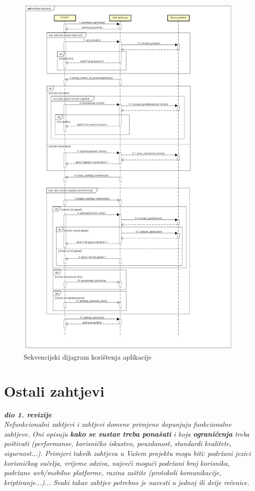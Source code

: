 				\begin{figure}[H]
					\includegraphics[scale=0.3]{slike/koristenje_aplikacije.JPG} %
					\centering
					\caption{Sekvencijski dijagram korištenja aplikacije}
					\label{fig:promjene}
				\end{figure}
	
		\section{Ostali zahtjevi}
		
			\textbf{\textit{dio 1. revizije}}\\
		 
			 \textit{Nefunkcionalni zahtjevi i zahtjevi domene primjene dopunjuju funkcionalne zahtjeve. Oni opisuju \textbf{kako se sustav treba ponašati} i koja \textbf{ograničenja} treba poštivati (performanse, korisničko iskustvo, pouzdanost, standardi kvalitete, sigurnost...). Primjeri takvih zahtjeva u Vašem projektu mogu biti: podržani jezici korisničkog sučelja, vrijeme odziva, najveći mogući podržani broj korisnika, podržane web/mobilne platforme, razina zaštite (protokoli komunikacije, kriptiranje...)... Svaki takav zahtjev potrebno je navesti u jednoj ili dvije rečenice.}
			 
			 
			 
	
